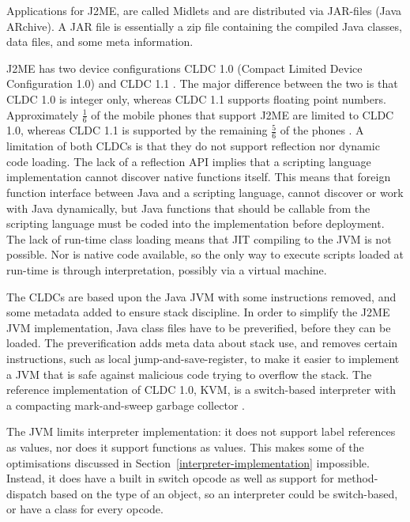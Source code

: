 \documentclass[11pt]{report}
\begin{document}
Applications for J2ME, are called Midlets and are distributed via JAR-files (Java ARchive). A JAR file is essentially a zip file containing the compiled Java classes, data files, and some meta information.

J2ME has two device configurations CLDC 1.0 (Compact Limited Device Configuration 1.0) \cite{cldc10}  and CLDC 1.1  \cite{cldc11}. The major difference between the two is that CLDC 1.0 is integer only, whereas CLDC 1.1 supports floating point numbers.
Approximately $\frac{1}{6}$ of the mobile phones that support J2ME are limited to CLDC 1.0, whereas CLDC 1.1 is supported by the remaining $\frac{5}{6}$ of the phones \cite{mobref}.
A limitation of both CLDCs is that they do not support reflection nor dynamic code loading.
The lack of a reflection API implies that a scripting language implementation cannot discover native functions itself. This means that foreign function interface between Java and a scripting language, cannot discover or work with Java dynamically, but Java functions that should be callable from the scripting language must be coded into the implementation before deployment.
The lack of run-time class loading means that JIT compiling to the JVM is not possible.
Nor is native code available, so the only way to execute scripts loaded at run-time is through interpretation, possibly via a virtual machine.

The CLDCs are based upon the Java JVM \cite{jvmref} with some instructions removed, and some metadata added to ensure stack discipline. 
In order to simplify the J2ME JVM implementation, Java class files have to be preverified, before they can be loaded.
The preverification adds meta data about stack use, and removes certain instructions, such as local jump-and-save-register, to make it easier to implement a JVM that is safe against malicious code trying to overflow the stack.
The reference implementation of CLDC 1.0, KVM, is a switch-based interpreter with a compacting mark-and-sweep garbage collector \cite{kvm}.

The JVM limits interpreter implementation: it does not support label references as values, nor does it support functions as values. This makes some of the optimisations discussed in 
Section~\ref{interpreter-implementation} impossible.
Instead, it does have a built in switch opcode as well as support for method-dispatch based on the type of an object, so an interpreter could be switch-based, or have a class for every opcode.
\end{document}
